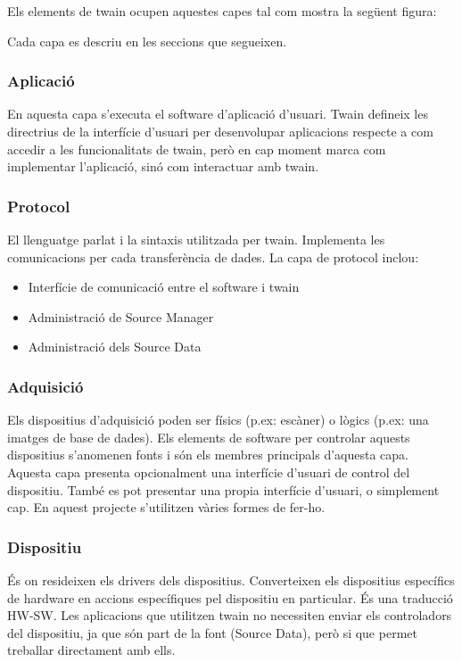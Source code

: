 \documentclass[letterpaper,11pt,catalan]{sphinxmanual}
\begin{document}
Els elements de twain ocupen aquestes capes tal com mostra la següent figura:


Cada capa es descriu en les seccions que segueixen.


\subsubsection{Aplicació}
\label{\detokenize{index:aplicacio}}
En aquesta capa s'executa el software d'aplicació d'usuari.
Twain defineix les directrius de la interfície d'usuari per desenvolupar
aplicacions respecte a com accedir a les funcionalitats de twain, però
en cap moment marca com implementar l'aplicació, sinó com interactuar amb
twain.


\subsubsection{Protocol}
\label{\detokenize{index:protocol}}
El llenguatge parlat i la sintaxis utilitzada per twain. Implementa les comunicacions
per cada transferència de dades.
La capa de protocol inclou:
\begin{itemize}
\item {} 
Interfície de comunicació entre el software i twain

\item {} 
Administració de Source Manager

\item {} 
Administració dels Source Data

\end{itemize}


\subsubsection{Adquisició}
\label{\detokenize{index:adquisicio}}
Els dispositius d'adquisició poden ser físics (p.ex: escàner) o lògics (p.ex: una imatges de base de dades).
Els elements de software per controlar aquests dispositius s'anomenen fonts i són els membres
principals d'aquesta capa. Aquesta capa presenta opcionalment una interfície d'usuari de control
del dispositiu. També es pot presentar una propia interfície d'usuari, o simplement cap.
En aquest projecte s'utilitzen vàries formes de fer-ho.


\subsubsection{Dispositiu}
\label{\detokenize{index:dispositiu}}
És on resideixen els drivers dels dispositius. Converteixen els dispositius específics de hardware
en accions específiques pel dispositiu en particular. És una traducció HW-SW. Les aplicacions
que utilitzen twain no necessiten enviar els controladors del dispositiu, ja que són part de la font (Source Data),
però si que permet treballar directament amb ells.
\end{document}
